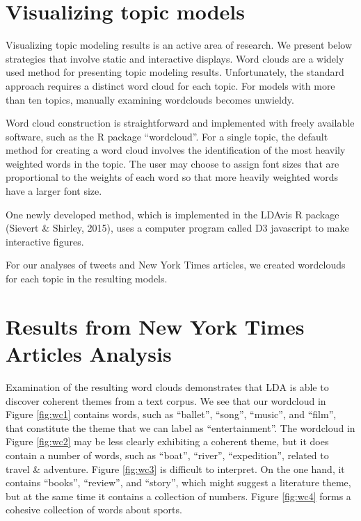 \documentclass[12pt,]{article}
\begin{document}
\section{Visualizing topic models}\label{visualizing-topic-models}

Visualizing topic modeling results is an active area of research. We
present below strategies that involve static and interactive displays.
Word clouds are a widely used method for presenting topic modeling
results. Unfortunately, the standard approach requires a distinct word
cloud for each topic. For models with more than ten topics, manually
examining wordclouds becomes unwieldy.

Word cloud construction is straightforward and implemented with freely
available software, such as the R package ``wordcloud''. For a single
topic, the default method for creating a word cloud involves the
identification of the most heavily weighted words in the topic. The user
may choose to assign font sizes that are proportional to the weights of
each word so that more heavily weighted words have a larger font size.

One newly developed method, which is implemented in the LDAvis R package
(Sievert \& Shirley, 2015), uses a computer program called D3 javascript
to make interactive figures.

For our analyses of tweets and New York Times articles, we created
wordclouds for each topic in the resulting models.

\section{Results from New York Times Articles
Analysis}\label{results-from-new-york-times-articles-analysis}

Examination of the resulting word clouds demonstrates that LDA is able
to discover coherent themes from a text corpus. We see that our
wordcloud in Figure \ref{fig:wc1} contains words, such as ``ballet'',
``song'', ``music'', and ``film'', that constitute the theme that we can
label as ``entertainment''. The wordcloud in Figure \ref{fig:wc2} may be
less clearly exhibiting a coherent theme, but it does contain a number
of words, such as ``boat'', ``river'', ``expedition'', related to travel
\& adventure. Figure \ref{fig:wc3} is difficult to interpret. On the one
hand, it contains ``books'', ``review'', and ``story'', which might
suggest a literature theme, but at the same time it contains a
collection of numbers. Figure \ref{fig:wc4} forms a cohesive collection
of words about sports.
\end{document}
